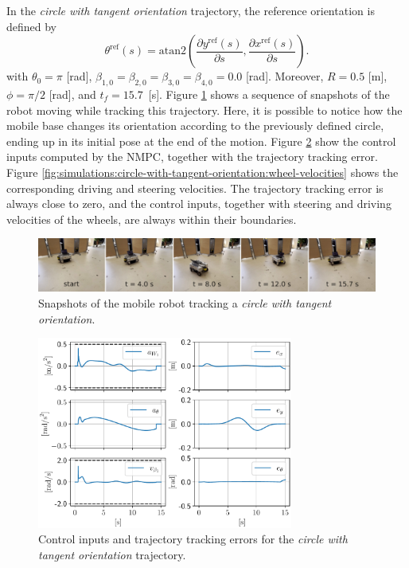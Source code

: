 In the \textit{circle with tangent orientation} trajectory, the reference
orientation is defined by
\begin{equation}
    \theta^{\mathrm{ref}}(s) = \mathrm{atan2}\left(\frac{\partial y^{\mathrm{ref}}(s)}{\partial s}, \frac{\partial x^{\mathrm{ref}}(s)}{\partial s}\right).
    \label{eq:reference-tangent-orientation}
\end{equation}
with $\theta_0=\pi$ [rad], $\beta_{1,0}=\beta_{2,0}=\beta_{3,0}=\beta_{4,0}=0.0$ [rad].
Moreover, $R=0.5$ [m], $\phi=\pi/2$ [rad], and $t_f=15.7$~[s].
Figure \ref{fig:experiments:circle-with-tangent-orientation:snapshots} shows
a sequence of snapshots of the robot moving while tracking this trajectory.
Here, it is possible to notice how the mobile base changes its orientation
according to the previously defined circle, ending up in its initial pose at
the end of the motion.
Figure \ref{fig:simulations:circle-with-tangent-orientation:inputs-and-errors}
show the control inputs computed by the NMPC, together with the trajectory
tracking error.
Figure \ref{fig:simulations:circle-with-tangent-orientation:wheel-velocities}
shows the corresponding driving and steering velocities.
The trajectory tracking error is always close to zero, and the control inputs,
together with steering and driving velocities of the wheels, are always within
their boundaries.
\begin{figure}
    \centering
    \includegraphics[width=\textwidth]{figures/SWMR/simulations/circular_with_tangent_orientation/snapshots.jpeg}
    \caption{Snapshots of the mobile robot tracking a \textit{circle with tangent orientation}.}
    \label{fig:experiments:circle-with-tangent-orientation:snapshots}
\end{figure}
\begin{figure}
    \centering
    \includegraphics[width=0.75\textwidth]{figures/SWMR/simulations/circular_with_tangent_orientation/inputs_and_errors.pdf}
    \caption{Control inputs and trajectory tracking errors for the \textit{circle with tangent orientation} trajectory.}
    \label{fig:simulations:circle-with-tangent-orientation:inputs-and-errors}
\end{figure}
